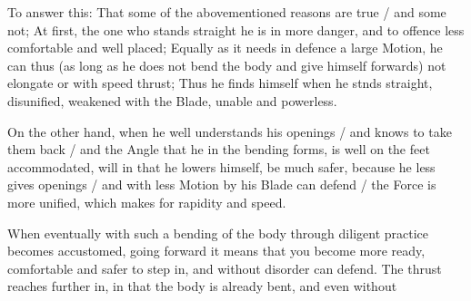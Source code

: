 To answer this: That some of the abovementioned reasons are true / and
some not; At first, the one who stands straight he is in more danger,
and to offence less comfortable and well placed; Equally as it needs
in defence a large Motion, he can thus (as long as he does not
bend the body and give himself forwards) not elongate or with speed
thrust; Thus he finds himself when he stnds straight, disunified,
weakened with the Blade, unable and powerless.


On the other hand, when he well understands his openings / and knows to
take them back / and the Angle that he in the bending forms, is well
on the feet accommodated, will in that he lowers himself, be much safer, because he less gives
openings / and with less Motion by his Blade can defend / the Force is
more unified, which makes for rapidity and speed.


When eventually with such a bending of the body through diligent
practice becomes accustomed, going forward it means that you become
more ready, comfortable and safer to step in, and without disorder can
defend. The thrust reaches further in, in that the body is already
bent, and even without
